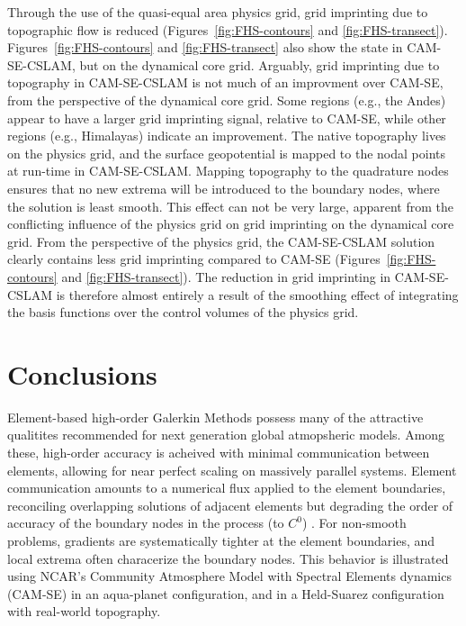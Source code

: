 \documentclass[twocol]{ametsoc}
\begin{document}
Through the use of the quasi-equal area physics grid, grid imprinting due to topographic flow is reduced (Figures~\ref{fig:FHS-contours} and \ref{fig:FHS-transect}). Figures~\ref{fig:FHS-contours} and \ref{fig:FHS-transect} also show the state in CAM-SE-CSLAM, but on the dynamical core grid. Arguably, grid imprinting due to topography in CAM-SE-CSLAM is not much of an improvment over CAM-SE, from the perspective of the dynamical core grid. Some regions (e.g., the Andes) appear to have a larger grid imprinting signal, relative to CAM-SE, while other regions (e.g., Himalayas) indicate an improvement. The native topography lives on the physics grid, and the surface geopotential is mapped to the nodal points at run-time in CAM-SE-CSLAM. Mapping topography to the quadrature nodes ensures that no new extrema will be introduced to the boundary nodes, where the solution is least smooth. This effect can not be very large, apparent from the conflicting influence of the physics grid on grid imprinting on the dynamical core grid. From the perspective of the physics grid, the CAM-SE-CSLAM solution clearly contains less grid imprinting compared to CAM-SE (Figures~\ref{fig:FHS-contours} and \ref{fig:FHS-transect}). The reduction in grid imprinting in CAM-SE-CSLAM is therefore almost entirely a result of the smoothing effect of integrating the basis functions over the control volumes of the physics grid.





\section{Conclusions}

Element-based high-order Galerkin Methods possess many of the attractive qualitites recommended for next generation global atmopsheric models. Among these, high-order accuracy is acheived with minimal communication between elements, allowing for near perfect scaling on massively parallel systems. Element communication amounts to a numerical flux applied to the element boundaries, reconciling overlapping solutions of adjacent elements but degrading the order of accuracy of the boundary nodes in the process (to $C^0$) {\color{red}{Peter - is order of accuracy not the same thing?}}. For non-smooth problems, gradients are systematically tighter at the element boundaries, and local extrema often characerize the boundary nodes. This behavior is illustrated using NCAR's Community Atmosphere Model with Spectral Elements dynamics (CAM-SE) in an aqua-planet configuration, and in a Held-Suarez configuration with real-world topography. 
\end{document}
